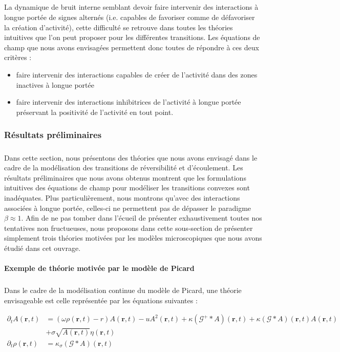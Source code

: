 \subparagraph{}La dynamique de bruit interne semblant devoir faire intervenir des interactions à longue portée de signes alternés (i.e. capables de favoriser comme de défavoriser la création d'activité), cette difficulté se retrouve dans toutes les théories intuitives que l'on peut proposer pour les différentes transitions. Les équations de champ que nous avons envisagées permettent donc toutes de répondre à ces deux critères :

\begin{itemize}
	\item faire intervenir des interactions capables de créer de l'activité dans des zones inactives à longue portée
	\item faire intervenir des interactions inhibitrices de l'activité à longue portée préservant la positivité de l'activité en tout point.
\end{itemize}

\subsubsection{Résultats préliminaires}

\subparagraph{}Dans cette section, nous présentons des théories que nous avons envisagé dans le cadre de la modélisation des transitions de réversibilité et d'écoulement. Les résultats préliminaires que nous avons obtenus montrent que les formulations intuitives des équations de champ pour modéliser les transitions convexes sont inadéquates. Plus particulièrement, nous montrons qu'avec des interactions associées à longue portée, celles-ci ne permettent pas de dépasser le paradigme $\beta \approx 1$. Afin de ne pas tomber dans l'écueil de présenter exhaustivement toutes nos tentatives non fructueuses, nous proposons dans cette sous-section de présenter simplement trois théories motivées par les modèles microscopiques que nous avons étudié dans cet ouvrage.

\paragraph{Exemple de théorie motivée par le modèle de Picard}

\subparagraph{}Dans le cadre de la modélisation continue du modèle de Picard, une théorie envisageable est celle représentée par les équations suivantes :

\begin{equation}
    \begin{aligned}
        \partial_t A (\mathbf{r}, t) &= \left(\omega \rho (\mathbf{r}, t)-r\right) A (\mathbf{r}, t) - uA^2 (\mathbf{r}, t) + \kappa \left(\mathcal{G}^+\ast A \right)(\mathbf{r}, t) + \kappa\left(\mathcal{G}\ast A \right)(\mathbf{r}, t)A (\mathbf{r}, t) \\
        &+\sigma \sqrt{A (\mathbf{r}, t)}\eta(\mathbf{r}, t)\\
        \partial_t \rho (\mathbf{r}, t) &= \kappa_\sigma \left(\mathcal{G}\ast A \right)(\mathbf{r}, t)
    \end{aligned}
\label{eq:YieldingD}
\end{equation}

